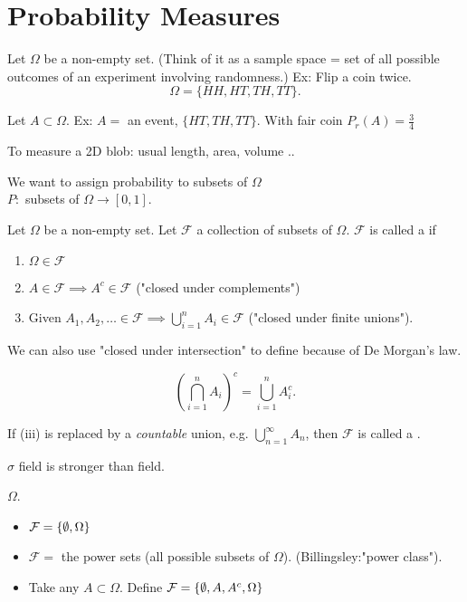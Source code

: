 \documentclass[class=article, crop=false]{standalone}
\begin{document}
\section{Probability Measures}
Let $\Omega$ be a non-empty set. 
(Think of it as a sample space = set of all possible outcomes of an experiment involving randomness.)
Ex: Flip a coin twice.
\[
	\Omega=\{HH,HT,TH,TT\}
.\]

Let $ A \subset \Omega$. 
Ex: $A=$ an event, $\{HT,TH,TT\}$.
With fair coin $P_r (A) = \frac{3}{4}$

To measure a 2D blob: usual length, area, volume ..

We want to assign probability to subsets of $\Omega$\\
$P:$ subsets of  $\Omega \to [0,1]$.

\begin{defn}[Field]
	Let $\Omega$ be a non-empty set. Let $\mathcal{F}$ a collection of subsets of $\Omega$. $\mathcal{F}$ is called a  if
	\begin{enumerate}
		\item $\Omega \in \mathcal{F}$
		\item $A\in \mathcal{F} \implies A^{c} \in \mathcal{F} $ ("closed under complements")
		\item Given $A_1,A_2,\ldots \in \mathcal{F} \implies \bigcup_{i= 1}^{ n} A_i \in \mathcal{F}$ ("closed under finite unions"). 
	\end{enumerate}
\end{defn}
\begin{remark}
We can also use "closed under intersection" to define because of De Morgan's law.
\end{remark}
\[
	\left( \bigcap_{i= 1}^{ n} A_i \right)^{c} = \bigcup_{i= 1}^{ n} A_i^{c}
.\] 
\begin{defn}
	If (iii) is replaced by a \emph{countable} union, e.g. $\bigcup_{n= 1}^{\infty} A_n $, then $\mathcal{F}$ is called a .  
\end{defn}
\begin{remark}
$\sigma$ field is stronger than field.
\end{remark}
\begin{eg}

\end{eg}
$\Omega$.\\

\begin{itemize}
	\item $\mathcal{F}=\{\emptyset,\Omega\}$
	\item $\mathcal{F} =$ the power sets (all possible subsets of $\Omega$). (Billingsley:"power class").
	\item Take any $A\subset \Omega$. Define $\mathcal{F}=\{\emptyset,A,A^{c},\Omega\}$
\end{itemize}
\end{document}
